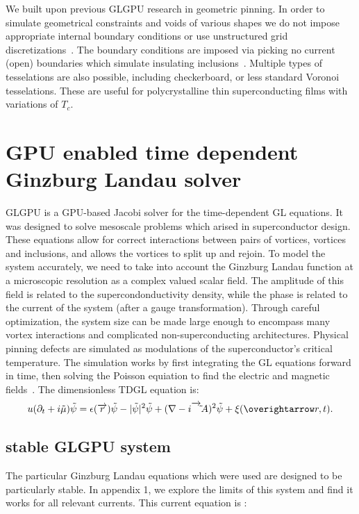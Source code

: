 We built upon previous GLGPU research in geometric pinning. In order to simulate geometrical constraints and voids of various shapes we do not impose appropriate internal boundary conditions or use unstructured grid discretizations~\cite{Kwok16}. The boundary conditions are imposed via picking no current (open) boundaries which simulate insulating inclusions~\cite{Sadovskyy14}. Multiple types of tesselations are also possible, including checkerboard, or less standard Voronoi tesselations. These are useful for polycrystalline thin superconducting films with variations of $T_c$.

\section{GPU enabled time dependent Ginzburg Landau solver}
GLGPU is a GPU-based Jacobi solver for the time-dependent GL equations. It was designed to solve mesoscale problems which arised in superconductor design. These equations allow for correct interactions between pairs of vortices, vortices and inclusions, and allows the vortices to split up and rejoin. To model the system accurately, we need to take into account the Ginzburg Landau function at a microscopic resolution as a complex valued scalar field. The amplitude of this field is related to the supercondonductivity density, while the phase is related to the current of the system (after a gauge transformation). Through careful optimization, the system size can be made large enough to encompass many vortex interactions and complicated non-superconducting architectures. Physical pinning defects are simulated as modulations of the superconductor's critical temperature. The simulation works by first integrating the GL equations forward in time, then solving the Poisson equiation to find the electric and magnetic fields~\cite{Sadovskyy14}. The dimensionless TDGL equation is:
\begin{eqnarray}
u (\partial_t + i \tilde \mu ) \tilde \psi = \epsilon (\overrightarrow r) \tilde \psi - |\tilde \psi|^2 \tilde \psi + (\nabla - i \overrightarrow \tilde A)^2 \tilde \psi + \xi (\overightarrow r , t). 
\label{unitless}
\end{eqnarray}


\subsection{stable GLGPU system}
The particular Ginzburg Landau equations which were used are designed to be particularly stable. In appendix 1, we explore the limits of this system and find it works for all relevant currents. This current equation is :

